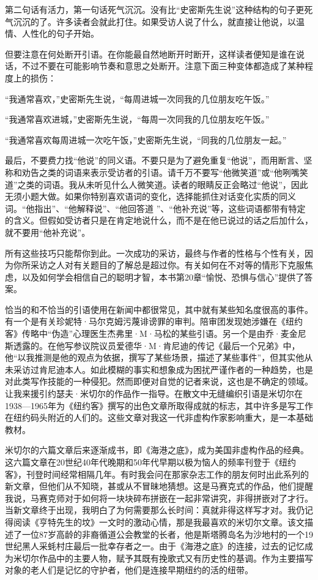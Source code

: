 第二句话有活力，第一句话死气沉沉。没有比“史密斯先生说”这种结构的句子更死气沉沉的了。许多读者会就此打住。如果受访人说了什么，就直接让他说，以温情、人性化的句子开始。

但要注意在何处断开引语。在你能最自然地断开时断开，这样读者便知是谁在说话，不过不要在可能影响节奏和意思之处断开。注意下面三种变体都造成了某种程度上的损伤：

“我通常喜欢，”史密斯先生说，“每周进城一次同我的几位朋友吃午饭。”

“我通常喜欢进城，”史密斯先生说，“每周一次同我的几位朋友吃午饭。”

“我通常喜欢每周进城一次吃午饭，”史密斯先生说，“同我的几位朋友一起。”

最后，不要费力找“他说”的同义语。不要只是为了避免重复“他说”，而用断言、坚称和劝告之类的词语来表示受访者的引语。请千万不要写“他微笑道”或“他咧嘴笑道”之类的词语。我从未听见什么人微笑道。读者的眼睛反正会略过“他说”，因此无须小题大做。如果你特别喜欢语词的变化，选择能抓住对话变化实质的同义词。“他指出”、“他解释说”、“他回答道
”、“他补充说”等，这些词语都带有特定的含义。但假如受访者只是在肯定地说什么，而不是在他已说过的话之后加什么，就不要用“他补充说”。

所有这些技巧只能帮你到此。一次成功的采访，最终与作者的性格与个性有关，因为你所采访之人对有关题目的了解总是超过你。有关如何在不对等的情形下克服焦虑，以及如何学会相信自己的聪明才智，本书第20章“愉悦、恐惧与信心”提供了答案。

恰当的和不恰当的引语使用在新闻中都很常见，其中就有某些知名度很高的事件。有一个是有关珍妮特·马尔克姆污蔑诽谤罪的审判。陪审团发现她涉嫌在《纽约客》传略中“伪造”心理医生杰弗里·M·马松的某些引语。另一个是由乔·麦金尼斯透露的。在他写参议院议员爱德华·M·肯尼迪的传记《最后一个兄弟》中，他“以我推测是他的观点为依据，撰写了某些场景，描述了某些事件”，但其实他从未采访过肯尼迪本人。如此模糊的事实和想象成为困扰严谨作者的一种趋势，也是对此类写作技能的一种侵犯。然而即便对自觉的记者来说，这也是不确定的领域。让我来援引约瑟夫·米切尔的作品作一指导。在散文中无缝编织引语是米切尔在1938—1965年为《纽约客》撰写的出色文章所取得成就的标志，其中许多是写工作在纽约码头附近的人们的。这些文章对我这一代非虚构作家影响重大，是一本基础教材。

米切尔的六篇文章后来逐渐成书，即《海港之底》，成为美国非虚构作品的经典。这六篇文章在20世纪40年代晚期和50年代早期以极为恼人的频率刊登于《纽约客》，刊登时间经常相隔几年。有时我会问在那家杂志工作的朋友何时出此系列的新文章，但他们从不知晓，甚或从不冒昧地猜想。这是马赛克式的作品，他们提醒我说，马赛克师对于如何将一块块碎布拼嵌在一起非常讲究，非得拼嵌对了才行。当新文章终于出现，我明白了为何需要那么长时间：真就非得这样写才对。我仍记得阅读《亨特先生的坟》一文时的激动心情，那是我最喜欢的米切尔文章。该文描述了一位87岁高龄的非裔循道公会教堂的长者，他是斯塔腾岛名为沙地村的一个19世纪黑人采蚝村庄最后一批幸存者之一。由于《海港之底》的连接，过去的记忆成为米切尔作品中的主要人物，赋予其既有挽歌式又有历史性的基调。作为主要描写对象的老人们是记忆的守护者，他们是连接早期纽约的活的纽带。

